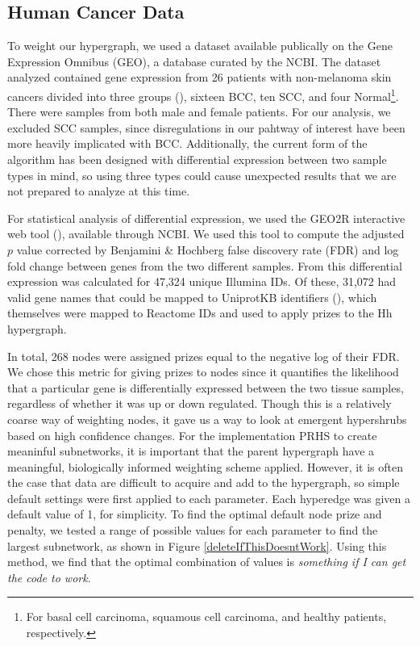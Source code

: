\documentclass[12pt,twoside]{reedthesis}
\theoremstyle{definition}
\begin{document}
   \subsection{Human Cancer Data}
   To weight our hypergraph, we used a dataset available publically on the Gene Expression Omnibus (GEO), a database curated by the NCBI. The dataset analyzed contained gene expression from 26 patients with non-melanoma skin cancers divided into three groups (\cite{Jee2015}), sixteen BCC, ten SCC, and four Normal\footnote{For basal cell carcinoma, squamous cell carcinoma, and healthy patients, respectively.}. There were samples from both male and female patients. For our analysis, we excluded SCC samples, since disregulations in our pahtway of interest have been more heavily implicated with BCC. Additionally, the current form of the algorithm has been designed with differential expression between two sample types in mind, so using three types could cause unexpected results that we are not prepared to analyze at this time.\par

   For statistical analysis of differential expression, we used the GEO2R interactive web tool (\cite{Davis2007}), available through NCBI. We used this tool to compute the adjusted $p$ value corrected by Benjamini \& Hochberg false discovery rate (FDR) and log fold change between genes from the two different samples. From this differential expression was calculated for 47,324 unique Illumina IDs. Of these, 31,072 had valid gene names that could be mapped to UniprotKB identifiers (\cite{TheUniProtConsortium2014}), which themselves were mapped to Reactome IDs and used to apply prizes to the Hh hypergraph.\par

   In total, 268 nodes were assigned prizes equal to the negative log of their FDR. We chose this metric for giving prizes to nodes since it quantifies the likelihood that a particular gene is differentially expressed between the two tissue samples, regardless of whether it was up or down regulated. Though this is a relatively coarse way of weighting nodes, it gave us a way to look at emergent hypershrubs based on high confidence changes. For the implementation PRHS to create meaninful subnetworks, it is important that the parent hypergraph have a meaningful, biologically informed weighting scheme applied. However, it is often the case that data are difficult to acquire and add to the hypergraph, so simple default settings were first applied to each parameter. Each hyperedge was given a default value of 1, for simplicity. To find the optimal default node prize and penalty, we tested a range of possible values for each parameter to find the largest subnetwork, as shown in Figure \ref{deleteIfThisDoesntWork}. Using this method, we find that the optimal combination of values is \emph{something if I can get the code to work}.
\end{document}
